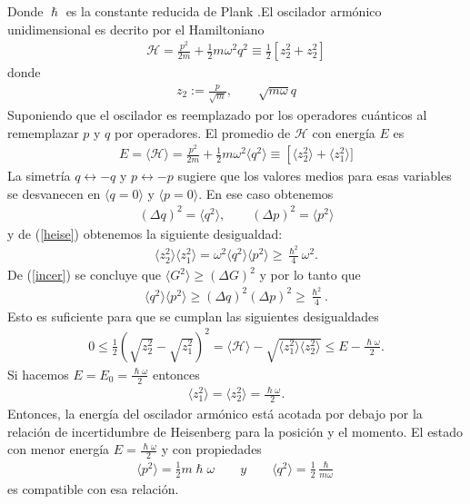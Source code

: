 \documentclass[letterpaper,12pt,oneside]{book}
\begin{document}
%
Donde $\hslash$ es la constante reducida de Plank .El oscilador arm\'onico unidimensional es decrito por el Hamiltoniano 
%
\begin{eqnarray}
\mathcal{H}= \frac{p^2}{2m} +\frac{1}{2}m\omega^2q^2 \equiv \frac{1}{2}\left[z^2_2+z^2_2\right] 
\end{eqnarray}
%
donde
%
\begin{eqnarray}
z_2 := \frac{p}{\sqrt{m}}, \qquad \sqrt{m\omega}q
\end{eqnarray}
%
Suponiendo que el oscilador es reemplazado por los operadores cu\'anticos al rememplazar $p$ y $q$ por operadores. El promedio de $\mathcal{H}$ con energ\'ia $E$ es
%
\begin{eqnarray}
E = \langle \mathcal{H} \rangle = \frac{p^2}{2m} + \frac{1}{2}m\omega^2\langle q^2 \rangle \equiv \left[\langle z^2_2 \rangle + \langle z^2_1 \rangle] \right.
\end{eqnarray}
%
La simetr\'ia $q \leftrightarrow -q$ y $p \leftrightarrow -p$ sugiere que los valores medios para esas variables se desvanecen en $\langle q=0 \rangle$ y $\langle p=0 \rangle$. En ese caso obtenemos
%
\begin{eqnarray}
(\Delta q)^2 = \langle q^2 \rangle, \qquad (\Delta p)^2 = \langle p^2 \rangle
\end{eqnarray}
%
y de (\ref{heise}) obtenemos la siguiente desigualdad:
%
\begin{eqnarray}
\langle z_2^2 \rangle \langle z_1^2 \rangle = \omega^2 \langle q^2 \rangle \langle p^2 \rangle \geq  \frac{\hslash^2}{4}\omega^2.
\end{eqnarray}
%
De (\ref{incer}) se concluye que $\langle G^2 \rangle \geq ( \Delta G)^2$ y por lo tanto que
%
\begin{eqnarray}
\langle q^2 \rangle\langle p^2 \rangle \geq (\Delta q)^2(\Delta p)^2 \geq \frac{\hslash^2}{4}.
\end{eqnarray}
%
Esto es suficiente para que se cumplan las siguientes desigualdades
%
\begin{eqnarray}
0\leq\frac{1}{2}\left (\sqrt{z_2^2}-\sqrt{z_1^2}\right)^2 = \langle \mathcal{H} \rangle - \sqrt{ \langle z_1^2 \rangle \langle z_2^2 \rangle} \leq E - \frac{\hslash \omega }{2}.
\end{eqnarray}
%
Si hacemos $E=E_0=\frac{\hslash \omega }{2}$ entonces 
%
\begin{eqnarray}
\langle z_1^2 \rangle = \langle z_2^2 \rangle = \frac{\hslash\omega}{2}.
\end{eqnarray}
%
Entonces, la energ\'ia del oscilador arm\'onico est\'a acotada por debajo por la relaci\'on de incertidumbre de Heisenberg para la posici\'on y el momento. El estado con menor energ\'ia $E=\frac{\hslash\omega}{2}$ y con propiedades
%
\begin{eqnarray}
\langle p^2 \rangle = \frac{1}{2}m\hslash\omega \qquad y \qquad \langle q^2 \rangle = \frac{1}{2}\frac{\hslash}{m\omega}  
\end{eqnarray}
%
es compatible con esa relaci\'on.
\end{document}
